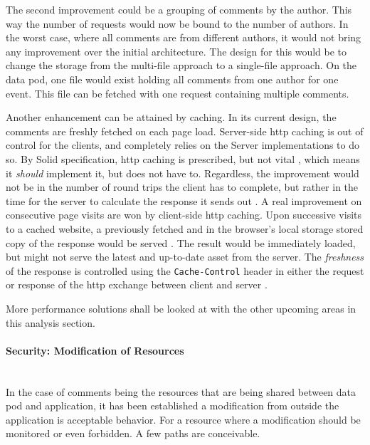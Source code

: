 The second improvement could be a grouping of comments by the author. This way the number of requests would now be bound to the number of authors. In the worst case, where all comments are from different authors, it would not bring any improvement over the initial architecture. The design for this would be to change the storage from the multi-file approach to a single-file approach. On the data pod, one file would exist holding all comments from one author for one event. This file can be fetched with one request containing multiple comments.

Another enhancement can be attained by caching. In its current design, the comments are freshly fetched on each page load. Server-side \gls{http} caching is out of control for the clients, and completely relies on the Server implementations to do so. By Solid specification, \gls{http} caching is prescribed, but not vital \cite{solid-protocol}, which means it \textit{should} implement it, but does not have to. Regardless, the improvement would not be in the number of round trips the client has to complete, but rather in the time for the server to calculate the response it sends out \cite{http-caching}. A real improvement on consecutive page visits are won by client-side \gls{http} caching. Upon successive visits to a cached website, a previously fetched and in the browser's local storage stored copy of the response would be served \cite{http-caching}. The result would be immediately loaded, but might not serve the latest and up-to-date asset from the server. The \textit{freshness} of the response is controlled using the \texttt{Cache-Control} header in either the request or response of the \gls{http} exchange between client and server \cite{http-caching}. 

More performance solutions shall be looked at with the other upcoming areas in this analysis section.
\vspace{0.5cm}
\paragraph{Security: Modification of Resources}\mbox{}\\

In the case of comments being the resources that are being shared between data pod and application, it has been established a modification from outside the application is acceptable behavior. For a resource where a modification should be monitored or even forbidden. A few paths are conceivable.

